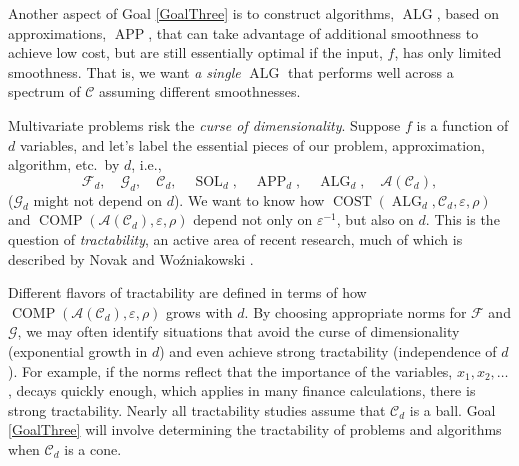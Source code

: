 \documentclass[11pt]{NSFamsart}
\DeclareMathOperator{\cost}{COST}
\DeclareMathOperator{\comp}{COMP}
\DeclareMathOperator{\SOL}{SOL}
\DeclareMathOperator{\APP}{APP}
\DeclareMathOperator{\ALG}{ALG}
\newcommand{\cc}{\mathcal{C}}
\newcommand{\cala}{{\mathcal{A}}}
\newcommand{\calc}{{\mathcal{C}}}
\newcommand{\calf}{{\mathcal{F}}}
\newcommand{\calg}{{\mathcal{G}}}
\begin{document}
Another aspect of Goal \ref{GoalThree} is to construct algorithms, $\ALG$, based on approximations, $\APP$, that can take advantage of additional smoothness to achieve low cost, but are still essentially optimal if the input, $f$, has only limited smoothness.  That is, we want \emph{a single} $\ALG$ that performs well across a spectrum of  $\calc$ assuming different smoothnesses.

Multivariate problems risk the \emph{curse of dimensionality}.  Suppose $f$ is a function of $d$ variables, and let's label the essential pieces of our problem, approximation, algorithm, etc.\ by $d$, i.e., 
\begin{equation}
    \calf_d, \quad \calg_d, \quad \calc_d, \quad \SOL_d, \quad \APP_d,\quad \ALG_d, \quad \cala(\calc_d),
\end{equation}
($\calg_d$ might not depend on $d$).  We want to know how $\cost(\ALG_d, \calc_d, \varepsilon,\rho)$ and $\comp(\cala(\cc_d), \varepsilon,\rho)$ depend not only on $\varepsilon^{-1}$, but also on $d$.  This is the question of \emph{tractability}, an active area of recent research, much of which is described by Novak and Wo\'zniakowski \cite{NovWoz08a,NovWoz10a,NovWoz12a}.

Different flavors of tractability are defined in terms of how  $\comp(\cala(\cc_d), \varepsilon,\rho)$ grows with $d$.  By choosing appropriate norms for $\calf$ and $\calg$, we may often identify situations that avoid the curse of dimensionality (exponential growth in $d$) and even achieve strong tractability (independence of $d$).   For example, if the norms reflect that the importance of the variables, $x_1, x_2, \ldots$, decays quickly enough, which applies in many finance calculations, there is strong tractability.  Nearly all tractability studies assume that $\calc_d$ is a ball.  Goal \ref{GoalThree} will involve determining the tractability of problems and algorithms when $\calc_d$ is a cone.
\end{document}
